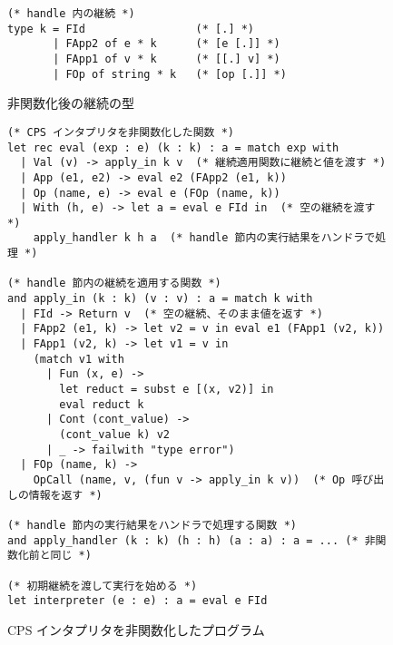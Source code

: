 
\begin{figure}
\begin{verbatim}
(* handle 内の継続 *)
type k = FId                 (* [.] *)
       | FApp2 of e * k      (* [e [.]] *)
       | FApp1 of v * k      (* [[.] v] *)
       | FOp of string * k   (* [op [.]] *)
\end{verbatim}
\caption{非関数化後の継続の型}
\label{figure:k_2defun}
\end{figure}

\begin{figure}
\begin{verbatim}
(* CPS インタプリタを非関数化した関数 *)
let rec eval (exp : e) (k : k) : a = match exp with
  | Val (v) -> apply_in k v  (* 継続適用関数に継続と値を渡す *)
  | App (e1, e2) -> eval e2 (FApp2 (e1, k))
  | Op (name, e) -> eval e (FOp (name, k))
  | With (h, e) -> let a = eval e FId in  (* 空の継続を渡す *)
    apply_handler k h a  (* handle 節内の実行結果をハンドラで処理 *)

(* handle 節内の継続を適用する関数 *)
and apply_in (k : k) (v : v) : a = match k with
  | FId -> Return v  (* 空の継続、そのまま値を返す *)
  | FApp2 (e1, k) -> let v2 = v in eval e1 (FApp1 (v2, k))
  | FApp1 (v2, k) -> let v1 = v in
    (match v1 with
      | Fun (x, e) ->
        let reduct = subst e [(x, v2)] in
        eval reduct k
      | Cont (cont_value) ->
        (cont_value k) v2
      | _ -> failwith "type error")
  | FOp (name, k) ->
    OpCall (name, v, (fun v -> apply_in k v))  (* Op 呼び出しの情報を返す *)

(* handle 節内の実行結果をハンドラで処理する関数 *)
and apply_handler (k : k) (h : h) (a : a) : a = ... (* 非関数化前と同じ *)

(* 初期継続を渡して実行を始める *)
let interpreter (e : e) : a = eval e FId
\end{verbatim}
\caption{CPS インタプリタを非関数化したプログラム}
\label{figure:2defun}
\end{figure}



